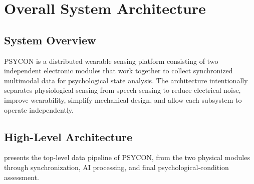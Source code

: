 \section{Overall System Architecture}
\label{sec:overall-architecture}

\subsection{System Overview}
\label{sec:system-overview}

PSYCON is a distributed wearable sensing platform consisting of two independent electronic modules that work together to collect synchronized multimodal data for psychological state analysis. The architecture intentionally separates physiological sensing from speech sensing to reduce electrical noise, improve wearability, simplify mechanical design, and allow each subsystem to operate independently.

\subsection{High-Level Architecture}
\label{sec:high-level-architecture-ch3}

 presents the top-level data pipeline of PSYCON, from the two physical modules through synchronization, AI processing, and final psychological-condition assessment.

